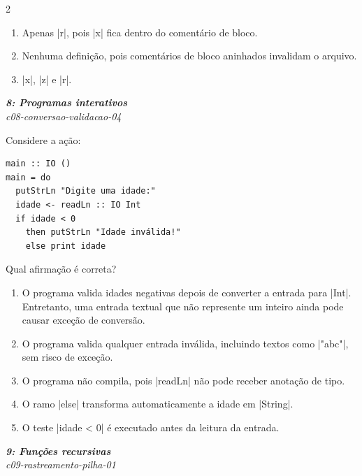 \documentclass[a4paper,10pt,brazil]{article}
\begin{document}
\begin{multicols}{2}
\begin{enumerate}
  \item Apenas \haskellinline|r|, pois \haskellinline|x| fica dentro do comentário de bloco.

  \item Nenhuma definição, pois comentários de bloco aninhados invalidam o arquivo.

  \item \haskellinline|x|, \haskellinline|z| e \haskellinline|r|.


\end{enumerate}

\begin{flushright}
  \footnotesize
  \textit{\textbf{8: Programas interativos}}\\
  \textit{c08-conversao-validacao-04}\\

\end{flushright}
Considere a ação:

\begin{verbatim}
main :: IO ()
main = do
  putStrLn "Digite uma idade:"
  idade <- readLn :: IO Int
  if idade < 0
    then putStrLn "Idade inválida!"
    else print idade
\end{verbatim}

Qual afirmação é correta?

\begin{enumerate}
  \item O programa valida idades negativas depois de converter a entrada para \haskellinline|Int|. Entretanto, uma entrada textual que não represente um inteiro ainda pode causar exceção de conversão.

  \item O programa valida qualquer entrada inválida, incluindo textos como \haskellinline|"abc"|, sem risco de exceção.

  \item O programa não compila, pois \haskellinline|readLn| não pode receber anotação de tipo.

  \item O ramo \haskellinline|else| transforma automaticamente a idade em \haskellinline|String|.

  \item O teste \haskellinline|idade < 0| é executado antes da leitura da entrada.


\end{enumerate}

\begin{flushright}
  \footnotesize
  \textit{\textbf{9: Funções recursivas}}\\
  \textit{c09-rastreamento-pilha-01}\\


\end{flushright}
\end{multicols}
\end{document}
